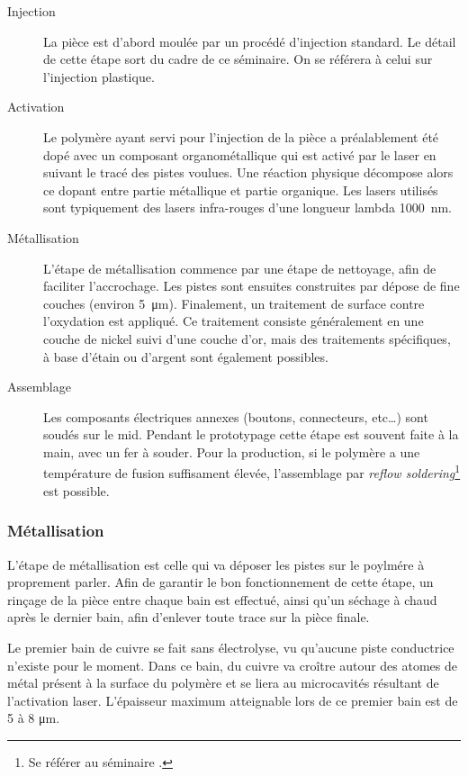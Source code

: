 \begin{description}
    \item[Injection] La pièce est d'abord moulée par un procédé d'injection standard.
        Le détail de cette étape sort du cadre de ce séminaire.
        On se référera à celui sur l'injection plastique.

    \item[Activation] Le polymère ayant servi pour l'injection de la pièce a préalablement été dopé avec un composant organométallique qui est activé par le laser en suivant le tracé des pistes voulues.
        Une réaction physique décompose alors ce dopant entre partie métallique et partie organique.
        Les lasers utilisés sont typiquement des lasers infra-rouges d'une longueur lambda \SI{1000}{\nano\meter}.
    \item[Métallisation] L'étape de métallisation commence par une étape de nettoyage, afin de faciliter l'accrochage.
        Les pistes sont ensuites construites par dépose de fine couches (environ \SI{5}{\micro\meter}).
        Finalement, un traitement de surface contre l'oxydation est appliqué.
        Ce traitement consiste généralement en une couche de nickel suivi d'une couche d'or, mais des traitements spécifiques, à base d'étain ou d'argent sont également possibles.
    \item[Assemblage] Les composants électriques annexes (boutons, connecteurs, etc\ldots) sont soudés sur le \gls{mid}.
        Pendant le prototypage cette étape est souvent faite à la main, avec un fer à souder.
        Pour la production, si le polymère a une température de fusion suffisament élevée, l'assemblage par \emph{reflow soldering}\footnote{Se référer au séminaire \cite{smd-assembly-2013}.} est possible.

\end{description}

\subsubsection{Métallisation}
L'étape de métallisation est celle qui va déposer les pistes sur le poylmére à proprement parler.
Afin de garantir le bon fonctionnement de cette étape, un rinçage de la pièce entre chaque bain est effectué, ainsi qu'un séchage à chaud après le dernier bain, afin d'enlever toute trace sur la pièce finale.

Le premier bain de cuivre se fait sans électrolyse, vu qu'aucune piste conductrice n'existe pour le moment.
Dans ce bain, du cuivre va croître autour des atomes de métal présent à la surface du polymère et se liera au microcavités résultant de l'activation laser.
L'épaisseur maximum atteignable lors de ce premier bain est de 5 à 8 \si{\micro\meter}.

